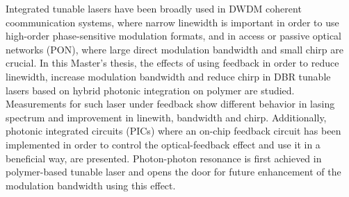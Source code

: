
\Abstract

Integrated tunable lasers have been broadly used in DWDM coherent coommunication systems, where narrow linewidth is important in order to use high-order phase-sensitive modulation formats, and in access or passive optical networks (PON), where large direct modulation bandwidth and small chirp are crucial. 
In this Master's thesis, the effects of using feedback in order to reduce linewidth, increase modulation bandwidth and reduce chirp in DBR tunable lasers based on hybrid photonic integration on polymer are studied.
Measurements for such laser under feedback show different behavior in lasing spectrum and improvement in linewith, bandwidth and chirp. 
Additionally, photonic integrated circuits (PICs) where an on-chip feedback circuit has been implemented in order to control the optical-feedback effect and use it in a beneficial way, are presented.
Photon-photon resonance is first achieved in polymer-based tunable laser and opens the door for future enhancement of the modulation bandwidth using this effect.


